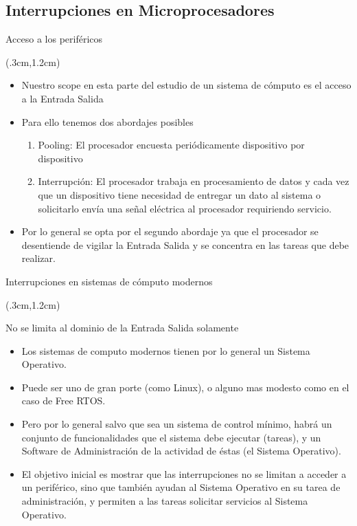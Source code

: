 \documentclass[table,x11names,aspectratio=169]{beamer}
\begin{document}
\subsection{Interrupciones en Microprocesadores}
\begin{frame}{Acceso a los periféricos}
 \begin{textblock*}{\textwidth}(.3cm,1.2cm)
  \begin{itemize}[<+(1)->]\justifying \parskip 0.3cm 
   \item Nuestro scope en esta parte del estudio de un sistema de cómputo es el acceso a la Entrada Salida
   \item Para ello tenemos dos abordajes posibles
   \begin{enumerate} \justifying \parskip 0.3cm
    \item Pooling: El procesador encuesta periódicamente dispositivo por dispositivo
    \item Interrupción: El procesador trabaja en procesamiento de datos y cada vez que un dispositivo tiene necesidad de entregar un dato al sistema o solicitarlo envía una señal eléctrica al procesador requiriendo servicio.
   \end{enumerate}
   \item Por lo general se opta por el segundo abordaje ya que el procesador se desentiende de vigilar la Entrada Salida y se concentra en las tareas que debe realizar.
  \end{itemize}
 \end{textblock*}
\end{frame}

\begin{frame}{Interrupciones en sistemas de cómputo modernos}
 \begin{textblock*}{\textwidth}(.3cm,1.2cm)
  \begin{block}{No se limita al dominio de la Entrada Salida solamente}
   \begin{itemize}[<+(1)->] \justifying
    \item Los sistemas de computo modernos tienen por lo general un Sistema Operativo.
    \item Puede ser uno de gran porte (como Linux), o alguno mas modesto como en el caso de Free RTOS.
    \item Pero por lo general salvo que sea un sistema de control mínimo, habrá un conjunto de funcionalidades que el sistema debe ejecutar (tareas), y un Software de Administración de la actividad de éstas (el Sistema Operativo).
    \item El objetivo inicial es mostrar que las interrupciones no se limitan a acceder a un periférico, sino que también ayudan al Sistema Operativo en su tarea de administración, y permiten a las tareas solicitar servicios al Sistema Operativo.
   \end{itemize}
  \end{block}
 \end{textblock*}
\end{frame}
\end{document}
